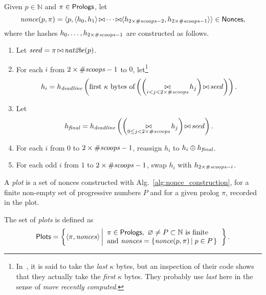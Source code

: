 \begin{alg}[$\nonce(p,\pi)$]\label{alg:nonce_construction}
  Given $p\in\mathbb{N}$ and $\pi\in{\mathsf{Prologs}}$, let
  \[
  {\mathit{nonce}}(p,\pi)=\langle p,\langle h_0,h_1\rangle\operatorname*{\bowtie}
  \cdots\operatorname*{\bowtie}\langle h_{2\times{\#\mathit{scoops}}-2},h_{2\times{\#\mathit{scoops}}-1}\rangle\rangle\in{\mathsf{Nonces}},
  \]
  where the hashes $h_0,\ldots,h_{2\times{\#\mathit{scoops}}-1}$ are constructed as follows.
  \begin{enumerate}
  \item Let ${\mathit{seed}}=\pi\operatorname*{\bowtie}{\mathit{nat2be}}(p)$.
  \item For each $i$ from $2\times{\#\mathit{scoops}}-1$ to $0$,
    let\footnote{In~\cite{SignumPlotting}, it is said to
    take the \emph{last} $\kappa$ bytes, but an inspection of their code
    shows that they actually take the \emph{first} $\kappa$ bytes. They
    probably use \emph{last} here in the sense of \emph{more recently computed}.}
    \[
    h_i=h_{\mathit{deadline}}\left(\text{first $\kappa$ bytes of}\left(\left(\operatorname*{\bowtie}_{i<j<2\times{\#\mathit{scoops}}}h_j\right)\operatorname*{\bowtie}{\mathit{seed}}\right)\right).
    \]
  \item Let
    \[
    {h_{\mathit{final}}}=h_{\mathit{deadline}}\left(\left(\operatorname*{\bowtie}_{0\le j<2\times{\#\mathit{scoops}}}h_j\right)\operatorname*{\bowtie}{\mathit{seed}}\right).
    \]
  \item For each $i$ from $0$ to $2\times{\#\mathit{scoops}}-1$, reassign
    $h_i$ to $h_i\oplus{h_{\mathit{final}}}$.
  \item For each odd $i$ from $1$ to $2\times{\#\mathit{scoops}}-1$, swap
    $h_i$ with $h_{2\times{\#\mathit{scoops}}-i}$.
  \end{enumerate}
\end{alg}
%
A \emph{plot} is a set of nonces constructed with Alg.~\ref{alg:nonce_construction},
for a finite non-empty set of progressive numbers $P$ and
for a given prolog $\pi$, recorded in the plot.
%
\begin{definition}[Plot]\label{def:plot}
  The set of \emph{plots} is defined as
  \[
  {\mathsf{Plots}}=\left\{\left<\pi,{\mathit{nonces}}\right>\left|\begin{array}{l}
  \pi\in{\mathsf{Prologs}},\ \varnothing\not=P\subset\mathbb{N}\text{ is finite}\\
  \text{and }{\mathit{nonces}}=\left\{{\mathit{nonce}}(p,\pi)\left|\;p\in P\right.\right\}
  \end{array}\right.\right\}.
  \]
\end{definition}
